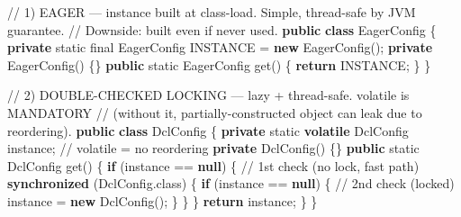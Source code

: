 \documentclass[11pt]{article}
\newenvironment{Shaded}{\begin{snugshade}}{\end{snugshade}}
\newcommand{\CommentTok}[1]{\textcolor[rgb]{0.48,0.49,0.49}{#1}}
\newcommand{\ControlFlowTok}[1]{\textcolor[rgb]{0.99,0.74,0.29}{\textbf{#1}}}
\newcommand{\DataTypeTok}[1]{\textcolor[rgb]{0.16,0.50,0.73}{#1}}
\newcommand{\FunctionTok}[1]{\textcolor[rgb]{0.56,0.27,0.68}{#1}}
\newcommand{\KeywordTok}[1]{\textcolor[rgb]{0.81,0.81,0.76}{\textbf{#1}}}
\newcommand{\NormalTok}[1]{\textcolor[rgb]{0.81,0.81,0.76}{#1}}
\newcommand{\OperatorTok}[1]{\textcolor[rgb]{0.81,0.81,0.76}{#1}}
\begin{document}
\begin{Shaded}
\begin{Highlighting}[]
\CommentTok{// 1) EAGER — instance built at class{-}load. Simple, thread{-}safe by JVM guarantee.}
\CommentTok{//    Downside: built even if never used.}
\KeywordTok{public} \KeywordTok{class}\NormalTok{ EagerConfig }\OperatorTok{\{}
    \KeywordTok{private} \DataTypeTok{static} \DataTypeTok{final}\NormalTok{ EagerConfig INSTANCE }\OperatorTok{=} \KeywordTok{new} \FunctionTok{EagerConfig}\OperatorTok{();}
    \KeywordTok{private} \FunctionTok{EagerConfig}\OperatorTok{()} \OperatorTok{\{\}}
    \KeywordTok{public} \DataTypeTok{static}\NormalTok{ EagerConfig }\FunctionTok{get}\OperatorTok{()} \OperatorTok{\{} \ControlFlowTok{return}\NormalTok{ INSTANCE}\OperatorTok{;} \OperatorTok{\}}
\OperatorTok{\}}

\CommentTok{// 2) DOUBLE{-}CHECKED LOCKING — lazy + thread{-}safe. \textasciigrave{}volatile\textasciigrave{} is MANDATORY}
\CommentTok{//    (without it, partially{-}constructed object can leak due to reordering).}
\KeywordTok{public} \KeywordTok{class}\NormalTok{ DclConfig }\OperatorTok{\{}
    \KeywordTok{private} \DataTypeTok{static} \KeywordTok{volatile}\NormalTok{ DclConfig instance}\OperatorTok{;}   \CommentTok{// volatile = no reordering}
    \KeywordTok{private} \FunctionTok{DclConfig}\OperatorTok{()} \OperatorTok{\{\}}
    \KeywordTok{public} \DataTypeTok{static}\NormalTok{ DclConfig }\FunctionTok{get}\OperatorTok{()} \OperatorTok{\{}
        \ControlFlowTok{if} \OperatorTok{(}\NormalTok{instance }\OperatorTok{==} \KeywordTok{null}\OperatorTok{)} \OperatorTok{\{}                   \CommentTok{// 1st check (no lock, fast path)}
            \KeywordTok{synchronized} \OperatorTok{(}\NormalTok{DclConfig}\OperatorTok{.}\FunctionTok{class}\OperatorTok{)} \OperatorTok{\{}
                \ControlFlowTok{if} \OperatorTok{(}\NormalTok{instance }\OperatorTok{==} \KeywordTok{null}\OperatorTok{)} \OperatorTok{\{}           \CommentTok{// 2nd check (locked)}
\NormalTok{                    instance }\OperatorTok{=} \KeywordTok{new} \FunctionTok{DclConfig}\OperatorTok{();}
                \OperatorTok{\}}
            \OperatorTok{\}}
        \OperatorTok{\}}
        \ControlFlowTok{return}\NormalTok{ instance}\OperatorTok{;}
    \OperatorTok{\}}
\OperatorTok{\}}


\end{Highlighting}
\end{Shaded}
\end{document}
